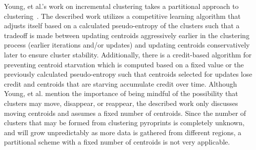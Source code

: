 \documentclass[12pt]{ucthesis}
\begin{document}
   Young, et al.'s work on incremental clustering takes a partitional approach
   to clustering~\cite{Young:Incremental}. The described work utilizes a
   competitive learning algorithm that adjusts itself based on a calculated
   pseudo-entropy of the clusters such that a tradeoff is made between updating
   centroids aggressively earlier in the clustering process (earlier iterations
   and/or updates) and updating centroids conservatively later to ensure
   cluster stability. Additionally, there is a credit-based algorithm for
   preventing centroid starvation which is computed based on a fixed value or
   the previously calculated pseudo-entropy such that centroids selected for
   updates lose credit and centroids that are starving accumulate credit over
   time. Although Young, et al. mention the importance of being mindful of the
   possibility that clusters may move, disappear, or reappear, the described
   work only discusses moving centroids and assumes a fixed number of
   centroids. Since the number of clusters that may be formed from clustering
   pyroprints is completely unknown, and will grow unpredictably as more data
   is gathered from different regions, a partitional scheme with a fixed number
   of centroids is not very applicable.
\end{document}
